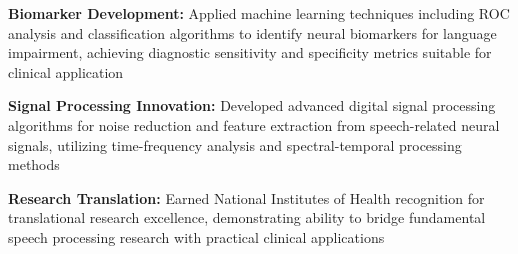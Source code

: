 \begin{cventries}
{\begin{cvitems}
        \item \textbf{Biomarker Development:} Applied machine learning techniques including ROC analysis and classification algorithms to identify neural biomarkers for language impairment, achieving diagnostic sensitivity and specificity metrics suitable for clinical application
        \item \textbf{Signal Processing Innovation:} Developed advanced digital signal processing algorithms for noise reduction and feature extraction from speech-related neural signals, utilizing time-frequency analysis and spectral-temporal processing methods
                \item \textbf{Research Translation:} Earned National Institutes of Health recognition for translational research excellence, demonstrating ability to bridge fundamental speech processing research with practical clinical applications
            \end{cvitems}
    }
\end{cventries}
